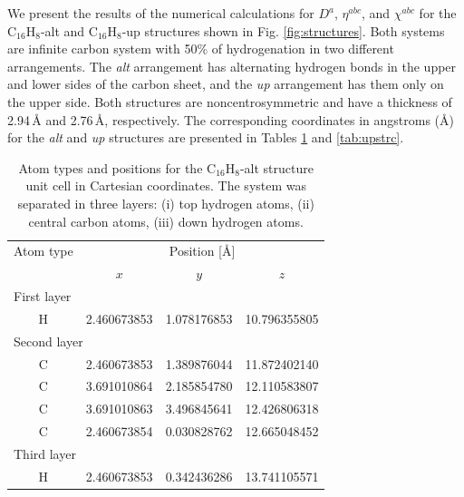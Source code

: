 \documentclass[pss]{wiley2sp} %
\begin{document}
We present the results of the numerical calculations for {$D^{a}$}, {$\eta^{abc}$}, and $\chi^{abc}$ for the C$_{16}$H$_{8}$-alt and C$_{16}$H$_{8}$-up structures shown in Fig. \ref{fig:structures}. Both systems are infinite carbon system with 50\% of hydrogenation in two different arrangements. The \emph{alt} arrangement has alternating hydrogen bonds in the upper and lower sides of the carbon sheet, and the \emph{up} arrangement has them only on the upper side. Both structures are noncentrosymmetric and have a thickness of 2.94\,{\AA} and 2.76\,{\AA}, respectively. The corresponding coordinates in angstroms (\AA) for the \emph{alt} and \emph{up} structures are presented in Tables \ref{tab:altstrc} and \ref{tab:upstrc}.
\begin{table}[t]
  \begin{tabular}{cccc}
  \hline
  Atom type &  \multicolumn{3}{c}{Position [\AA] } \\
  \cline{2-4}
  & $x$ & $y$ & $z$ \\
  \hline
  \multicolumn{2}{l}{First layer}\\
H & 2.460673853 & 1.078176853 & 10.796355805 \\
  \multicolumn{2}{l}{Second layer}\\
C & 2.460673853 & 1.389876044 & 11.872402140 \\
C & 3.691010864 & 2.185854780 & 12.110583807 \\
C & 3.691010863 & 3.496845641 & 12.426806318 \\
C & 2.460673854 & 0.030828762 & 12.665048452 \\
  \multicolumn{2}{l}{Third layer}\\
H & 2.460673853 & 0.342436286 & 13.741105571 \\
  \hline
  \end{tabular}
  \caption[]{%
  Atom types and positions for the C$_{16}$H$_{8}$-alt structure unit cell in Cartesian coordinates. The system was separated in three layers: (i) top hydrogen atoms, (ii) central carbon atoms, (iii) down hydrogen atoms. }
  \label{tab:altstrc}
\end{table}
\end{document}
